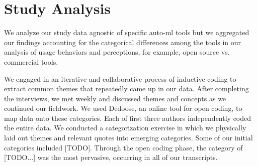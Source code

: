 \section{Study Analysis}
We analyze our study data agnostic of specific auto-ml tools but we aggregated our findings accounting for the categorical differences among the tools in our analysis of usage behaviors and perceptions, for example, open source vs. commercial tools.

We engaged in an iterative and collaborative process of inductive coding to extract common themes that repeatedly came up in our data. After completing the interviews, we met weekly and discussed themes and concepts as we continued our fieldwork. We used Dedoose, an online tool for open coding, to map data onto these categories. Each of first three authors independently coded the entire data. We conducted a categorization exercise in which we physically laid out themes and relevant quotes into emerging categories. Some of our initial categories included [TODO]. Through the open coding phase, the category of [TODO...] was the most pervasive, occurring in all of our transcripts.